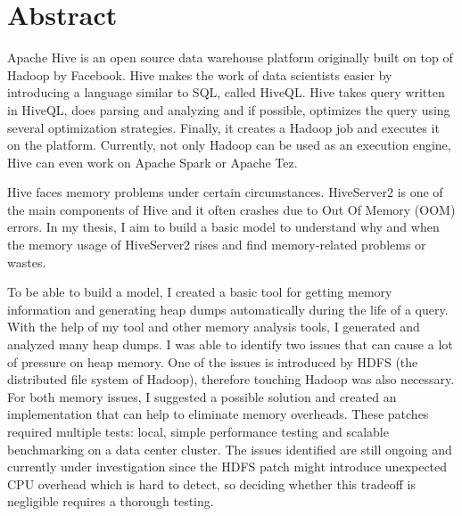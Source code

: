 \vfill
\selectenglish


\chapter*{Abstract}
Apache Hive is an open source data warehouse platform originally built on top of Hadoop by Facebook. Hive makes the work of data scientists easier by introducing a language similar to SQL, called HiveQL. Hive takes query written in HiveQL, does parsing and analyzing and if possible, optimizes the query using several optimization strategies. Finally, it creates a Hadoop job and executes it on the platform. Currently, not only Hadoop can be used as an execution engine, Hive can even work on Apache Spark or Apache Tez. 

Hive faces memory problems under certain circumstances. HiveServer2 is one of the main components of Hive and it often crashes due to Out Of Memory (OOM) errors. In my thesis, I aim to build a basic model to understand why and when the memory usage of HiveServer2 rises and find memory-related problems or wastes.

To be able to build a model, I created a basic tool for getting memory information and generating heap dumps automatically during the life of a query. With the help of my tool and other memory analysis tools, I generated and analyzed many heap dumps. I was able to identify two issues that can cause a lot of pressure on heap memory. One of the issues is introduced by HDFS (the distributed file system of Hadoop), therefore touching Hadoop was also necessary. For both memory issues, I suggested a possible solution and created an implementation that can help to eliminate memory overheads. These patches required multiple tests: local, simple performance testing and scalable benchmarking on a data center cluster. The issues identified are still ongoing and currently under investigation since the HDFS patch might introduce unexpected CPU overhead which is hard to detect, so deciding whether this tradeoff is negligible requires a thorough testing. 

\vfill
\selectthesislanguage

\setcounter{romanPage}{\value{page}}
